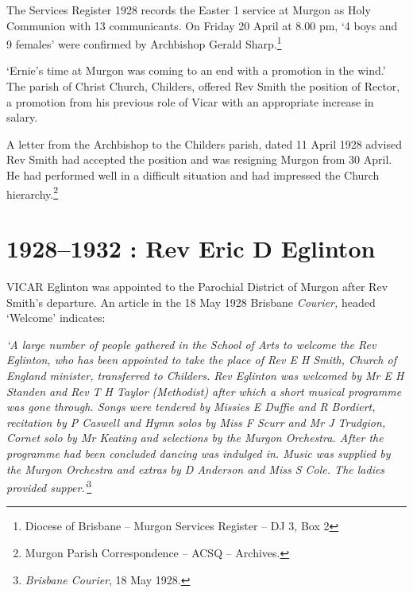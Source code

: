 The Services Register 1928 records the Easter 1 service at Murgon as Holy Communion with 13 communicants. On Friday 20 April at 8.00 pm, `4 boys and 9 females' were confirmed by Archbishop Gerald Sharp.\footnote{Diocese of Brisbane -- Murgon Services Register -- DJ 3, Box 2}


`Ernie's time at Murgon was coming to an end with a promotion in the wind.' The parish of Christ Church, Childers, offered Rev Smith the position of Rector, a promotion from his previous role of Vicar with an appropriate increase in salary.



A letter from the Archbishop to the Childers parish, dated 11 April 1928 advised Rev Smith had accepted the position and was resigning Murgon from 30 April. He had performed well in a difficult situation and had impressed the Church hierarchy.\footnote{Murgon Parish Correspondence -- ACSQ -- Archives.}


\balance


\printendnotes[custom]
\setcounter{endnote}{0}
\chapter{1928--1932 : Rev Eric D Eglinton}
\nobalance


\lettrine[lines=3]{V}{ICAR}
 Eglinton was appointed to the Parochial District of Murgon after Rev Smith's departure. An article in the 18 May 1928 Brisbane \emph{Courier,} headed `Welcome' indicates:

\emph{`A large number of people gathered in the School of Arts to welcome the Rev Eglinton, who has been appointed to take the place of Rev E H Smith, Church of England minister, transferred to Childers. Rev Eglinton was welcomed by Mr E H Standen and Rev T H Taylor (Methodist) after which a short musical programme was gone through. Songs were tendered by Missies E Duffie and R Bordiert, recitation by P Caswell and Hymn solos by Miss F Scurr and Mr J Trudgion, Cornet solo by Mr Keating and selections by the Murgon Orchestra. After the programme had been concluded dancing was indulged in. Music was supplied by the Murgon Orchestra and extras by D Anderson and Miss S Cole. The ladies provided supper.'}\footnote{\emph{Brisbane Courier}, 18 May 1928.}


